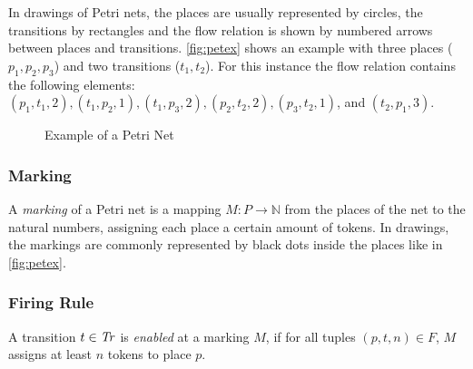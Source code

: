In drawings of Petri nets, the places are usually represented by circles, the transitions by rectangles and the flow relation is shown by numbered arrows between places and transitions. \autoref{fig:petex} shows an example with three places ($p_{1},p_{2},p_{3}$) and two transitions ($t_{1},t_{2}$). For this instance the flow relation contains the following elements: $(p_{1},t_{1},2), (t_{1},p_{2},1), (t_{1},p_{3},2),\allowbreak (p_{2},t_{2},2), (p_{3},t_{2},1)$, and $(t_{2},p_{1},3)$.

\begin{figure}[H]
\centering 
\caption{Example of a Petri Net}\label{fig:petex}
\end{figure}

\subsubsection{Marking}
A \emph{marking} of a Petri net is a mapping $M : P \rightarrow \mathbb{N}$ from the places of the net to the natural numbers, assigning each place a certain amount of tokens. In drawings, the markings are commonly represented by black dots inside the places like in \autoref{fig:petex}.


\subsubsection{Firing Rule}
A transition $t \in \mathit{Tr}$ is \emph{enabled} at a marking $M$, if for all tuples $(p,t,n) \in F$, $M$ assigns at least $n$ tokens to place $p$.

